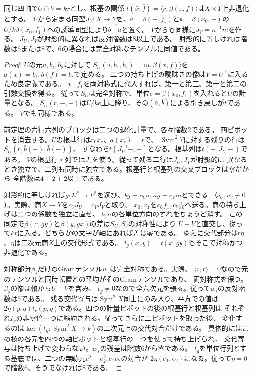 \begin{lemma}[根基直線上の三次形式]\label{lem:product-radical-cubic}
同じ四軸で$U\cap V=kr$とし、根基の関係
$t(\bar x,\bar f)=\langle r,\beta(x,f)\rangle$は$X\times Y$上非退化とする。
$U$から定まる同型$J_U:X\to Y$を、$a=\beta(-,f_1)$と$b=\beta(x_0,-)$の
$U/k\beta(x_0,f_1)$への誘導同型により$\bar b^{-1}\bar a$と置く。
$V$からも同様に$J_V=\bar n^{-1}\bar m$を作る。
$J_U,J_V$が射影的に異なれば反対階数は8以上である。
射影的に等しければ階数は6または8で、6の場合には完全対称なテンソルに同値である。
\end{lemma}
\begin{proof}
$U$の元$u,b_1,b_2$に対して
$S_U(u,b_1,b_2)=\langle u,\beta(x,f)\rangle$を$a(x)=b_1,b(f)=b_2$で定める。
二つの持ち上げの曖昧さの像は$V=U^\perp$に入るため良定義である。
$x_0,f_1$を両対称式に代入すれば、第一と第三、第一と第二の引数交換を得る。
従って$S_U$は完全対称で、単位$e=\beta(x_0,f_1)$を入れると$U$の計量となる。
$S_U(r,-,-)$は$U/ke$上に降り、その$(\bar a,\bar b)$による引き戻しが$t$である。
$V$でも同様である。

前定理の六行六列のブロックは二つの退化計量で、各々階数2である。
四ピボットを消去する。$U$の根基行は$x_0 x_r$、$a(x_r)=r$で、
$\operatorname{Sym}^2Y$に対する残りの行は$S_U(r,\bar b(-),\bar b(-))$、
すなわち$t(J_U^{-1}-, -)$となる。根基列は$t(-,J_U-)$である。
$V$の根基行・列では$J_V$を使う。従って残る二行は$J_U,J_V$が射影的に
異なるとき独立で、二列も同時に独立である。根基行と根基列の交叉ブロックは零だから
全階数は$4+2+2$以上である。

射影的に等しければ$g:E^*\to F^*$を選び、$b g=c_U a,n g=c_V m$とできる
（$c_U,c_V\ne0$）。実際、商$X\to Y$を$c_UJ_U=c_VJ_V$と取り、
$x_0,x_1$を$c_U f_1,c_V f_0$へ送る。商の持ち上げは二つの係数を独立に直せ、
$b,n$の各単位方向のずれをちょうど消す。
この同定で$\beta(x,gy)$と$\beta(y,gx)$の差は$S_U,S_V$の対称性により
$U+V$と直交し、従って$kr$に入る。どちらかの文字が軸にあれば差は零である。
ゆえに交代部分は$r\eta$、$\eta$は二次元商$X$上の交代形式である。
$t_g(x,y)=t(x,gy)$もそこで対称かつ非退化である。

対称部分$\beta_s$だけのGramテンソル$w_s$は完全対称である。実際、
$\langle r,r\rangle=0$なので元のテンソルと同時転置との平均がそのGramテンソルであり、
両対称式を保つ。$\beta_s$の像は軸から$U+V$を含み、
$t_g\ne0$なので全六次元を張る。従って$w_s$の反対階数は6である。
残る交代寄与は$\operatorname{Sym}^2 X$同士にのみ入り、平方での値は
$2\eta(p,q)t_g(p,q)$である。四つの計量ピボットの後の根基行と根基列は
それぞれ$t_g$の非零倍一つに縮約される。従ってさらに二ピボットを取った後、
変化するのは$\ker(t_g:\operatorname{Sym}^2 X\to k)$の二次元上の交代対合だけである。
具体的にはこの核の各元を四つの軸ピボットと根基行の一つを使って持ち上げられ、
交代寄与は持ち上げで変わらない。$w_s$の残差は階数6から零である。
$t_g$を単位行列とする基底では、二つの無跡元$e_1^2-e_2^2,e_1e_2$の対合が
$2\eta(e_1,e_2)$になる。従って$\eta=0$で階数6、そうでなければ8である。
\end{proof}

